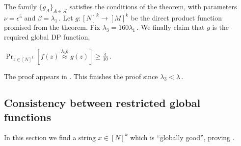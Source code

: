 \documentclass{toc}
\newcommand{\Prob}[2][]{\Pr_{{#1}}\left[#2\right]} %
\newcommand{\set}[1]{\{#1\}} %
\newcommand\f{f} %
\newcommand{\g}{g} %
\newcommand\neql[1]{\stackrel{{#1}}{ \approx}} %
\begin{document}
The family $\set{\g_A}_{A\in\mathcal{A}}$ satisfies the conditions of the theorem, with parameters $\nu = \epsilon^5$ and $\beta = \lambda_1$\,. Let $\g:[N]^k\rightarrow[M]^k$ be the direct product function promised from the theorem. 
%
%
%
Fix $\lambda_3 = 160\lambda_1$\,. We finally claim that $g$ is the required global DP function,
\begin{lemma}\label{lem:global DP}
$\Prob[{z\in[N]^k}]{\f(z) \neql{\lambda_3 k}\g(z)}\geq \frac{\epsilon}{10}$\,.
\end{lemma}
The proof appears in . This finishes the proof since $\lambda_3<\lambda$\,.



\subsection{Consistency between restricted global functions} \label{sec:cons}
In this section we find a string $x\in[N]^k$ which is ``globally good'', proving . 
\end{document}
